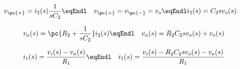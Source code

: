 \documentclass[journal]{IEEEtran}
\begin{document}
\begin{align}
 & v_{\pc{+}} = i_2(s)\dfrac{1}{sC_2}\eqEndl
 & v_{\pc{+}} = v_{\pc{-}} = v_o\eqEndl
 & i_2(s) = C_2 s v_o(s)\label{eq_corrente_i2}
\end{align}



\begin{align}
 & v_a(s) = \pc{R_2+\dfrac{1}{sC_2}}i_2(s)\eqEndl
 & v_a(s) = R_2C_2sv_o(s)+v_o(s)\label{eq_tensao_va}
\end{align}



% 
%  

\begin{align}
 & i_1(s) = \dfrac{v_i(s)-v_a(s)}{R_1}\eqEndl
 & i_1(s) = \dfrac{v_i(s)-R_2 C_2 sv_o(s)-v_o(s)}{R_1}\label{eq_corrente_i1}
\end{align}

\end{document}
